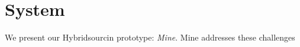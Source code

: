 \section{System}


We present our Hybridsourcin prototype: \emph{Mine}.
Mine addresses these challenges 



























